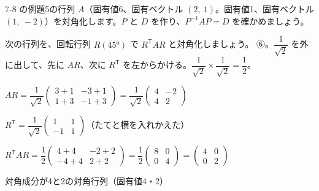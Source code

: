 \begin{jibun}
7-8 の例題5の行列 $A$（固有値6、固有ベクトル $(2,\ 1)$。固有値1、固有ベクトル $(1,\ -2)$）を対角化します。$P$ と $D$ を作り、$P^{-1}AP=D$ を確かめましょう。
\end{jibun}

\begin{reidai}
次の行列を、回転行列 $R(45°)$ で $R^{\mathsf T}AR$ と対角化しましょう。
\kangaekata ⑥。$\dfrac{1}{\sqrt2}$ を外に出して、先に $AR$、次に $R^{\mathsf T}$ を左からかける。$\dfrac{1}{\sqrt2}\times\dfrac{1}{\sqrt2}=\dfrac12$。\par
\shiki\kviijs{}\zw{} $AR=\dfrac{1}{\sqrt2}\begin{pmatrix}3+1&-3+1\\1+3&-1+3\end{pmatrix}=\dfrac{1}{\sqrt2}\begin{pmatrix}4&-2\\4&2\end{pmatrix}$\par
\kviija $R^{\mathsf T}=\dfrac{1}{\sqrt2}\begin{pmatrix}1&1\\-1&1\end{pmatrix}$（たてと横を入れかえた）\par
\kviija $R^{\mathsf T}AR=\dfrac12\begin{pmatrix}4+4&-2+2\\-4+4&2+2\end{pmatrix}=\dfrac12\begin{pmatrix}8&0\\0&4\end{pmatrix}=\begin{pmatrix}4&0\\0&2\end{pmatrix}$\par
\kotae\kviijs{}\zw{} 対角成分が4と2の対角行列（固有値4・2）
\end{reidai}

